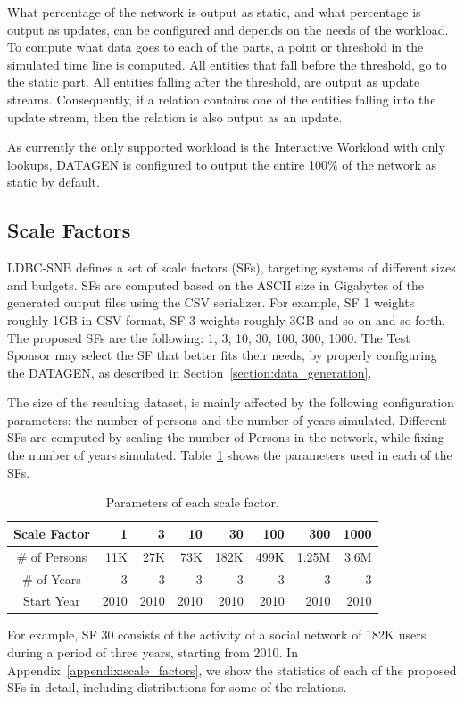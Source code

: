 What percentage of the network is output as static, and what percentage is
output as updates, can be configured and depends on the needs of the workload.
To compute what data goes to each of the parts, a point or threshold in the
simulated time line is computed. All entities that fall before the threshold,
go to the static part. All entities falling after the threshold, are output as
update streams. Consequently, if a relation contains one of the entities
falling into the update stream, then the relation is also output as an update.

As currently the only supported workload is the Interactive Workload with only
lookups, DATAGEN is configured to output the  entire 100\% of the network as
static by default.

\subsection{Scale Factors}

LDBC-SNB defines a set of scale factors (SFs), targeting systems of different
sizes and budgets.  SFs are computed based on the ASCII size in Gigabytes of
the generated output files using the CSV serializer. For example, SF 1 weights roughly 1GB in CSV
format, SF 3 weights roughly 3GB and so on and so forth.  The proposed SFs are
the following: 1, 3, 10, 30, 100, 300, 1000. The Test Sponsor may select the SF
that better fits their needs, by properly configuring the DATAGEN, as described
in Section~\ref{section:data_generation}.

The size of the resulting dataset, is mainly affected by the following
configuration parameters: the number of persons and the number of years
simulated. Different SFs are computed by scaling the number of Persons in
the network, while fixing the number of years simulated.
Table~\ref{tab:snsize} shows the parameters used in each of the SFs.

\begin{table}[H]
\centering
\begin{tabular}{|c||r|r|r|r|r|r|r|}
\hline  Scale Factor  & 1 &  3 & 10 & 30 & 100 & 300 & 1000 \\
\hline  \# of Persons  & 11K &  27K & 73K & 182K & 499K & 1.25M & 3.6M \\
\hline  \# of Years  & 3 &  3 & 3 & 3 & 3 & 3 & 3 \\
\hline  Start Year & 2010 &  2010 & 2010 & 2010 & 2010 & 2010 & 2010 \\
\hline
\end{tabular}
\centering
\caption{Parameters of each scale factor.}
\label{tab:snsize}
\end{table}

For example, SF 30 consists of the activity of a social network of 182K users
during a period of three years, starting from 2010. In
Appendix~\ref{appendix:scale_factors}, we show the statistics of each of the
proposed SFs in detail, including distributions for some of the relations.

